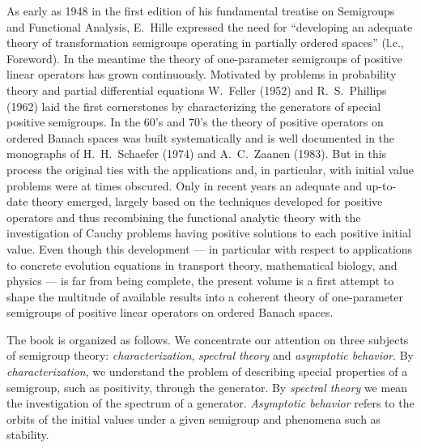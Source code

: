 %

\preface

As early as 1948 in the first edition of his fundamental treatise on Semigroups and Functional Analysis, E.~Hille expressed the need for \enquote{developing an adequate theory of transformation semigroups operating in partially ordered spaces} (l.c., Foreword). 
In the meantime the theory of one-parameter semigroups of positive linear operators has grown continuously. 
Motivated by problems in probability theory and partial differential equations W.~Feller (1952) and R.~S.~Phillips (1962) laid the first cornerstones by characterizing the generators of special positive semigroups. 
In the 60's and 70's the theory of positive operators on ordered Banach spaces was built systematically and is well documented in the monographs of H.~H.~Schaefer (1974) and A.~C.~Zaanen (1983). 
But in this process the original ties with the applications and, in particular, with initial value problems were at times obscured. 
Only in recent years an adequate and up-to-date theory emerged, largely based on the techniques developed for positive operators and thus recombining the functional analytic theory with the investigation of Cauchy problems having positive solutions to each positive initial value. 
Even though this development --- in particular with respect to applications to concrete evolution equations in transport theory, mathematical biology, and physics --- is far from being complete, the present volume is a first attempt to shape the multitude of available results into a coherent theory of one-parameter semigroups of positive linear operators on ordered Banach spaces.

The book is organized as follows.
We concentrate our attention on three subjects of semigroup theory: \emph{characterization}, \emph{spectral theory} and \emph{asymptotic behavior}. 
By \emph{characterization}, we understand the problem of describing special properties of a semigroup, such as positivity, through the generator. 
By \emph{spectral theory} we mean the investigation of the spectrum of a generator. 
\emph{Asymptotic behavior} refers to the orbits of the initial values under a given semigroup and phenomena such as stability.

